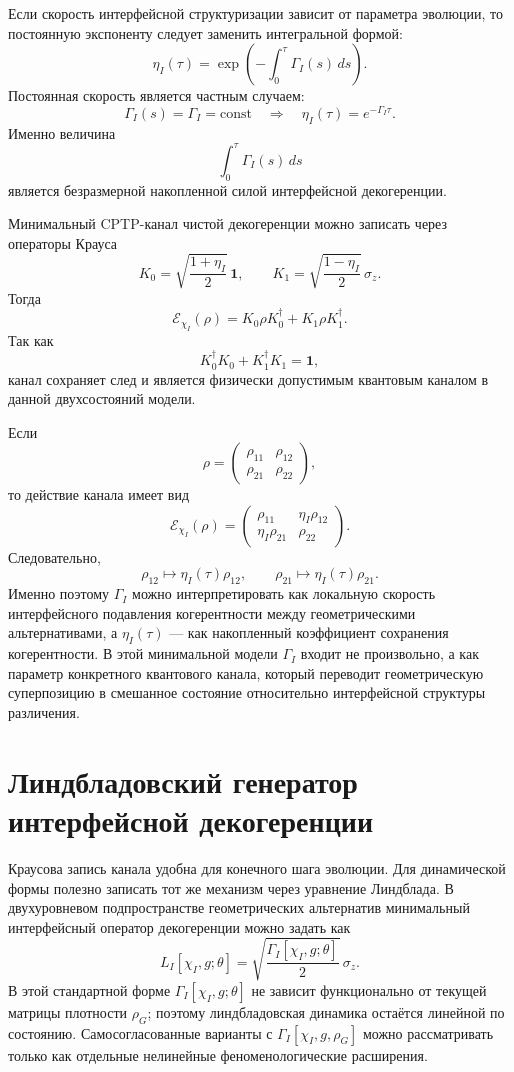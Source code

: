 \documentclass[12pt,a4paper]{article}
\newcommand{\Id}{\mathbf 1}
\begin{document}
Если скорость интерфейсной структуризации зависит от параметра эволюции, то постоянную экспоненту следует заменить интегральной формой:
\[
\boxed{
\eta_I(\tau)
=
\exp\left(-\int_0^\tau \Gamma_I(s)\,ds\right).
}
\]
Постоянная скорость является частным случаем:
\[
\Gamma_I(s)=\Gamma_I=\mathrm{const}
\quad\Rightarrow\quad
\eta_I(\tau)=e^{-\Gamma_I\tau}.
\]
Именно величина
\[
\int_0^\tau \Gamma_I(s)\,ds
\]
является безразмерной накопленной силой интерфейсной декогеренции.

Минимальный CPTP-канал чистой декогеренции можно записать через операторы Крауса
\[
\boxed{
K_0=
\sqrt{\frac{1+\eta_I}{2}}\,\Id,
\qquad
K_1=
\sqrt{\frac{1-\eta_I}{2}}\,\sigma_z.
}
\]
Тогда
\[
\boxed{
\mathcal E_{\chi_I}(\rho)
=
K_0\rho K_0^\dagger+K_1\rho K_1^\dagger.
}
\]
Так как
\[
K_0^\dagger K_0+K_1^\dagger K_1=\Id,
\]
канал сохраняет след и является физически допустимым квантовым каналом в данной двухсостояний модели.

Если
\[
\rho=
\begin{pmatrix}
\rho_{11} & \rho_{12}\\
\rho_{21} & \rho_{22}
\end{pmatrix},
\]
то действие канала имеет вид
\[
\boxed{
\mathcal E_{\chi_I}(\rho)=
\begin{pmatrix}
\rho_{11} & \eta_I\rho_{12}\\
\eta_I\rho_{21} & \rho_{22}
\end{pmatrix}.
}
\]
Следовательно,
\[
\boxed{
\rho_{12}\longmapsto \eta_I(\tau)\rho_{12},
\qquad
\rho_{21}\longmapsto \eta_I(\tau)\rho_{21}.
}
\]
Именно поэтому $\Gamma_I$ можно интерпретировать как локальную скорость интерфейсного подавления когерентности между геометрическими альтернативами, а $\eta_I(\tau)$ --- как накопленный коэффициент сохранения когерентности. В этой минимальной модели $\Gamma_I$ входит не произвольно, а как параметр конкретного квантового канала, который переводит геометрическую суперпозицию в смешанное состояние относительно интерфейсной структуры различения.



\section{Линдбладовский генератор интерфейсной декогеренции}

Краусова запись канала удобна для конечного шага эволюции. Для динамической формы полезно записать тот же механизм через уравнение Линдблада. В двухуровневом подпространстве геометрических альтернатив минимальный интерфейсный оператор декогеренции можно задать как
\[
\boxed{
L_I[\chi_I,g;\theta]
=
\sqrt{\frac{\Gamma_I[\chi_I,g;\theta]}{2}}\,\sigma_z.
}
\]
В этой стандартной форме $\Gamma_I[\chi_I,g;\theta]$ не зависит функционально от текущей матрицы плотности $\rho_G$; поэтому линдбладовская динамика остаётся линейной по состоянию. Самосогласованные варианты с $\Gamma_I[\chi_I,g,\rho_G]$ можно рассматривать только как отдельные нелинейные феноменологические расширения.
\end{document}
